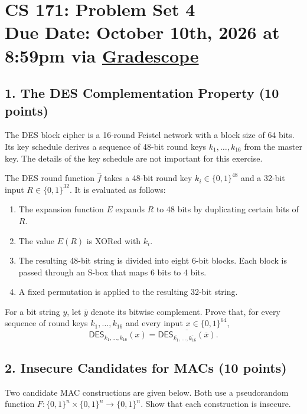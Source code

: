 \documentclass[11pt]{article}
\newcommand{\bin}{\{0,1\}}
\newcommand{\bit}{\bin}
\newcommand{\DES}{\mathsf{DES}}
\newcommand{\duedate}{October 10th, 2026 at 8:59pm via \href{https://www.gradescope.com/courses/689970}{Gradescope}}
\begin{document}
\section*{CS 171: Problem Set 4\\ {\small Due Date: \duedate}}

\subsection*{1. The DES Complementation Property (10 points)}

The DES block cipher is a 16-round Feistel network with a block size of
64 bits. Its key schedule derives a sequence of 48-bit round keys
$k_1,\ldots,k_{16}$ from the master key. The details of the key schedule
are not important for this exercise.

The DES round function $\widehat f$ takes a 48-bit round key
$k_i\in\bin^{48}$ and a 32-bit input $R\in\bin^{32}$. It is evaluated as
follows:
\begin{enumerate}
    \item The expansion function $E$ expands $R$ to 48 bits by duplicating
    certain bits of $R$.
    \item The value $E(R)$ is XORed with $k_i$.
    \item The resulting 48-bit string is divided into eight 6-bit blocks.
    Each block is passed through an S-box that maps 6 bits to 4 bits.
    \item A fixed permutation is applied to the resulting 32-bit string.
\end{enumerate}

For a bit string $y$, let $\overline y$ denote its bitwise complement.
Prove that, for every sequence of round keys $k_1,\ldots,k_{16}$ and every
input $x\in\bin^{64}$,
\[
    \DES_{k_1,\ldots,k_{16}}(x)
    =
    \overline{\DES_{\overline{k_1},\ldots,\overline{k_{16}}}
    (\overline{x})}.
\]

\pagebreak

\subsection*{2. Insecure Candidates for MACs (10 points)}

Two candidate MAC constructions are given below. Both use a pseudorandom
function $F:\bit^n\times\bit^n\to\bit^n$. Show that each construction is
insecure.
\end{document}
